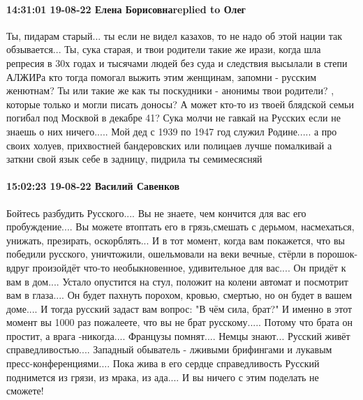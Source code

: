  
 
 
 
 

\paragraph{14:31:01 19-08-22 Елена Борисовнаreplied to Олег}

Ты, пидарам старый... ты если не видел казахов, то не надо об этой нации так обзывается... Ты, сука старая, и твои родители такие же ирази, когда шла репресия в 30х годах и тысячами людей без суда и следствия высылали в степи АЛЖИРа кто тогда помогал выжить этим женщинам, запомни - русским женютнам? Ты или такие же как ты поскудники - анонимы твои родители? , которые только и могли писать доносы? А может кто-то из твоей блядской семьи погибал под Москвой в декабре 41?
Сука молчи не гавкай на Русских если не знаешь о них ничего.....
Мой дед с 1939 по 1947 год служил Родине..... а про своих холуев, прихвостней бандеровских или полицаев лучше помалкивай а заткни свой язык себе в задницу, пидрила ты семимесясняй

\paragraph{15:02:23 19-08-22 Василий Савенков}
Бойтесь разбудить Русского....
Вы не знаете, чем кончится для вас его пробуждение.... Вы можете втоптать его в
грязь,смешать с дерьмом, насмехаться, унижать, презирать, оскорблять... И в тот момент, когда вам покажется, что вы победили русского, уничтожили, ошельмовали на веки вечные, стёрли в порошок- вдруг произойдёт что-то необыкновенное, удивительное для вас.... Он придёт к вам в дом.... Устало опустится на стул, положит на колени автомат и посмотрит вам в глаза.... Он будет пахнуть порохом, кровью, смертью, но он будет в вашем доме.... И тогда русский задаст вам вопрос: "В чём сила, брат?" И именно в этот момент вы 1000 раз пожалеете, что вы не брат русскому..... Потому что брата он простит, а врага -никогда.... Французы помнят.... Немцы знают... Русский живёт справедливостью....
Западный обыватель - лживыми брифингами и лукавым пресс-конференциями....
Пока жива в его сердце справедливость Русский поднимется из грязи, из мрака, из ада.... И вы ничего с этим поделать не сможете!
